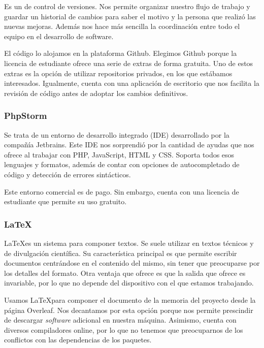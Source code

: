 Es un  de control de versiones. Nos permite organizar nuestro flujo de trabajo y guardar un historial de cambios para saber el motivo y la persona que realizó las nuevas mejoras. Además nos hace más sencilla la coordinación entre todo el equipo en el desarrollo de software. \par 

El código lo alojamos en la plataforma Github. Elegimos Github porque la licencia de estudiante ofrece una serie de extras de forma gratuita. Uno de estos extras es la opción de utilizar repositorios privados, en los que estábamos interesados. Igualmente, cuenta con una aplicación de escritorio que nos facilita la revisión de código antes de adoptar los cambios definitivos. \par 

\subsubsection{PhpStorm}

Se trata de un entorno de desarrollo integrado (IDE) desarrollado por la compañía Jetbrains. Este IDE nos sorprendió por la cantidad de ayudas que nos ofrece al trabajar con PHP, JavaScript, HTML y CSS. Soporta todos esos lenguajes y formatos, además de contar con opciones de autocompletado de código y detección de errores sintácticos. \par 

Este entorno comercial es de pago. Sin embargo, cuenta con una licencia de estudiante que permite su uso gratuito. \par 

\subsubsection{\LaTeX}
\LaTeX es un sistema para componer textos. Se suele utilizar en textos técnicos y de divulgación científica. Su característica principal es que permite escribir documentos centrándose en el contenido del mismo, sin tener que preocuparse por los detalles del formato. Otra ventaja que ofrece es que la salida que ofrece es invariable, por lo que no depende del dispositivo con el que estamos trabajando. \par 

Usamos \LaTeX para componer el documento de la memoria del proyecto desde la página Overleaf. Nos decantamos por esta opción porque nos permite prescindir de descargar \textit{software} adicional en nuestra máquina. Asimismo, cuenta con diversos compiladores online, por lo que no tenemos que preocuparnos de los conflictos con las dependencias de los paquetes. \par 


